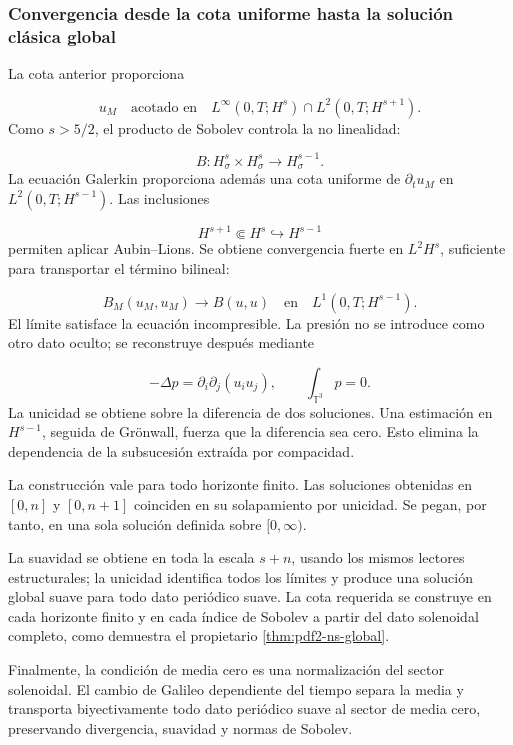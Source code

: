 \subsubsection{Convergencia desde la cota uniforme hasta la solución clásica global}
La cota anterior proporciona\par
\[
u_M
\quad\text{acotado en}\quad
L^\infty(0,T;H^s)
\cap L^2(0,T;H^{s+1}).
\]
Como \(s>5/2\), el producto de Sobolev controla la no linealidad:\par
\[
B:H^s_\sigma\times H^s_\sigma
\longrightarrow H^{s-1}_\sigma.
\]
La ecuación Galerkin proporciona además una cota uniforme de \(\partial_tu_M\) en \(L^2(0,T;H^{s-1})\). Las inclusiones\par
\[
H^{s+1}\Subset H^s\hookrightarrow H^{s-1}
\]
permiten aplicar Aubin–Lions. Se obtiene convergencia fuerte en \(L^2H^s\), suficiente para transportar el término bilineal:\par
\[
B_M(u_M,u_M)\longrightarrow B(u,u)
\quad\text{en}\quad
L^1(0,T;H^{s-1}).
\]
El límite satisface la ecuación incompresible. La presión no se introduce como otro dato oculto; se reconstruye después mediante\par
\[
-\Delta p=\partial_i\partial_j(u_i u_j),
\qquad
\int_{\mathbb T^3}p=0.
\]
La unicidad se obtiene sobre la diferencia de dos soluciones. Una estimación en \(H^{s-1}\), seguida de Grönwall, fuerza que la diferencia sea cero. Esto elimina la dependencia de la subsucesión extraída por compacidad.\par
La construcción vale para todo horizonte finito. Las soluciones obtenidas en \([0,n]\) y \([0,n+1]\) coinciden en su solapamiento por unicidad. Se pegan, por tanto, en una sola solución definida sobre \([0,\infty)\).\par
La suavidad se obtiene en toda la escala \(s+n\), usando los mismos lectores
estructurales; la unicidad identifica todos los límites y produce una solución
global suave para todo dato periódico suave. La cota requerida se construye
en cada horizonte finito y en cada índice de Sobolev a partir del dato
solenoidal completo, como demuestra el propietario
\cref{thm:pdf2-ns-global}.\par
Finalmente, la condición de media cero es una normalización del sector
solenoidal. El cambio de Galileo dependiente del tiempo separa la media y
transporta biyectivamente todo dato periódico suave al sector de media cero,
preservando divergencia, suavidad y normas de Sobolev.\par
{}
